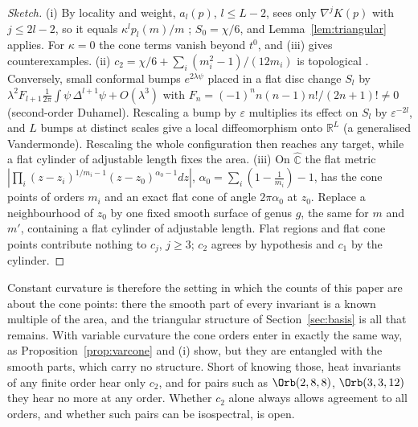 \begin{proof}[Sketch]
(i) By locality and weight, $a_l(p)$, $l\le L-2$, sees only $\nabla^jK(p)$ with $j\le2l-2$, so it equals
$\kappa^lp_l(m)/m$ \cite{ucar2017}; $S_0=\chi/6$, and Lemma~\ref{lem:triangular} applies. For $\kappa=0$ the cone
terms vanish beyond $t^0$, and (iii) gives counterexamples. (ii) $c_2=\chi/6+\sum_i(m_i^2-1)/(12m_i)$ is
topological \cite[(5.7)]{dggw2008}. Conversely, small conformal bumps $e^{2\lambda\psi}$ placed in a flat disc
change $S_l$ by $\lambda^2F_{l+1}\frac1{2\pi}\int\psi\,\Delta^{l+1}\psi+O(\lambda^3)$ with
$F_n=(-1)^nn(n-1)n!/(2n+1)!\ne0$ (second-order Duhamel). Rescaling a bump by $\varepsilon$ multiplies its effect
on $S_l$ by $\varepsilon^{-2l}$, and $L$ bumps at distinct scales give a local diffeomorphism onto
$\mathbb R^L$ (a generalised Vandermonde). Rescaling the whole configuration then reaches any target,
while a flat cylinder of adjustable length fixes the area. (iii) On $\hat{\mathbb C}$ the flat metric
$|\prod_i(z-z_i)^{1/m_i-1}(z-z_0)^{\alpha_0-1}dz|$, $\alpha_0=\sum_i(1-\frac1{m_i})-1$, has the cone points of
orders $m_i$ and an exact flat cone of angle $2\pi\alpha_0$ at $z_0$. Replace a neighbourhood of $z_0$ by
one fixed smooth surface of genus $g$, the same for $m$ and $m'$, containing a flat cylinder of adjustable
length. Flat regions and flat cone points contribute nothing to $c_j$, $j\ge3$; $c_2$ agrees by hypothesis
and $c_1$ by the cylinder.
\end{proof}

Constant curvature is therefore the setting in which the counts of this paper are about the cone points:
there the smooth part of every invariant is a known multiple of the area, and the triangular structure of
Section~\ref{sec:basis} is all that remains. With variable curvature the cone orders enter in exactly the
same way, as Proposition~\ref{prop:varcone} and (i) show, but they are entangled with the smooth parts, which carry no
structure. Short of knowing those, heat invariants of any finite order hear only $c_2$, and for pairs such as
$\Orb(2,8,8)$, $\Orb(3,3,12)$ they hear no more at any order. Whether $c_2$ alone always allows agreement to all
orders, and whether such pairs can be isospectral, is open.
